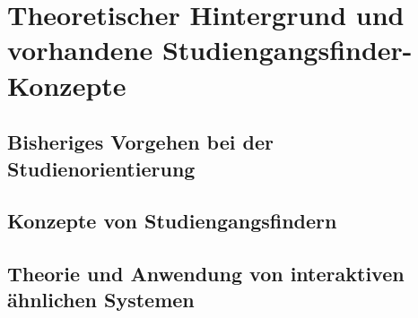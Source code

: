 \section{Theoretischer Hintergrund und vorhandene Studiengangsfinder-Konzepte}
\subsection{Bisheriges Vorgehen bei der Studienorientierung}

\subsection{Konzepte von Studiengangsfindern}

\subsection{Theorie und Anwendung von interaktiven ähnlichen Systemen}
